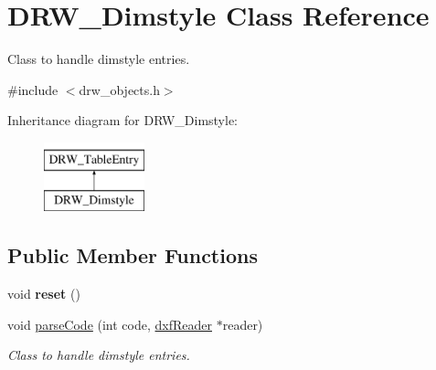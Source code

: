 \hypertarget{classDRW__Dimstyle}{\section{D\-R\-W\-\_\-\-Dimstyle Class Reference}
\label{classDRW__Dimstyle}
}


Class to handle dimstyle entries.  




{\ttfamily \#include $<$drw\-\_\-objects.\-h$>$}

Inheritance diagram for D\-R\-W\-\_\-\-Dimstyle\-:\begin{figure}[H]
\begin{center}
\leavevmode
\includegraphics[height=2.000000cm]{classDRW__Dimstyle}
\end{center}
\end{figure}
\subsection*{Public Member Functions}
\begin{DoxyCompactItemize}
\item 
\hypertarget{classDRW__Dimstyle_a788bad858ac358ac0a6747d3e6b63d0d}{void {\bfseries reset} ()}\label{classDRW__Dimstyle_a788bad858ac358ac0a6747d3e6b63d0d}

\item 
void \hyperlink{classDRW__Dimstyle_a31a3e3bf8780ee8b7b08efc145125e96}{parse\-Code} (int code, \hyperlink{classdxfReader}{dxf\-Reader} $\ast$reader)
\begin{DoxyCompactList}\small\item\em Class to handle dimstyle entries. \end{DoxyCompactList}\end{DoxyCompactItemize}
